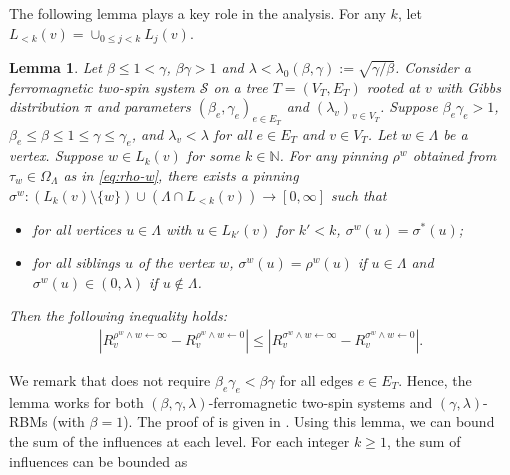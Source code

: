 \documentclass[11pt]{amsart}
\def\+#1{\mathcal{#1}}
\newcommand{\abs}[1]{\ensuremath{\left\vert#1\right\vert}}
\newcommand{\defeq}{:=}
\newtheorem{lemma}[theorem]{Lemma}
\theoremstyle{definition}
\theoremstyle{remark}
\begin{document}
The following lemma plays a key role in the analysis.
For any $k$, let $L_{<k}(v) = \cup_{0 \leq j < k}L_j(v)$.
\begin{lemma}\label{lemma:monotone-potential}
Let $\beta \leq 1 < \gamma$, $\beta\gamma > 1$ and $\lambda < \lambda_0(\beta,\gamma) \defeq \sqrt{\gamma/\beta}$.
Consider a ferromagnetic two-spin system $\+S$ on a tree $T = (V_T,E_T)$ rooted at $v$ with Gibbs distribution $\pi$ and parameters $(\beta_e,\gamma_e)_{e \in E_T}$ and $(\lambda_v)_{v \in V_T}$.
Suppose $\beta_e \gamma_e > 1$, $\beta_e \leq \beta \leq 1 \leq \gamma \leq \gamma_e$, and $\lambda_v < \lambda $ for all $e \in E_T$ and $v \in V_T$.
Let $w\in\Lambda$ be a vertex. Suppose $w \in L_k(v)$ for some $k \in \mathbb{N}$. 
For any pinning $\rho^w$ obtained from $\tau_w\in\Omega_{\Lambda}$ as in \eqref{eq:rho-w}, there exists a pinning $\sigma^w: (L_k(v) \setminus \{w\}) \cup (\Lambda \cap L_{<k}(v)) \to [0,\infty]$ such that
\begin{itemize}
\item for all vertices $u \in \Lambda$ with $u \in L_{k'}(v)$ for $k' < k$, $\sigma^w(u) = \sigma^*(u)$;
\item for all siblings $u$ of the vertex $w$, $\sigma^w(u) = \rho^w(u)$ if $u \in \Lambda$ and $\sigma^w(u) \in (0,\lambda)$ if $u \notin \Lambda$.
\end{itemize}
Then the following inequality holds:
\begin{align}\label{eq:lemma:monotone-inequality}
 \abs{R_v^{\rho^w \land w \gets \infty}-R_v^{\rho^w \land w \gets 0}} \leq \abs{R_v^{\sigma^w \land w \gets \infty}-R_v^{\sigma^w \land w \gets 0}}.
\end{align}
\end{lemma}
We remark that  does not require $\beta_e \gamma_e < \beta\gamma$ for all edges $e \in E_T$. Hence, the lemma works for both $(\beta,\gamma,\lambda)$-ferromagnetic two-spin systems and $(\gamma,\lambda)$-RBMs (with $\beta = 1$).
The proof of  is given in . Using this lemma, we can bound the sum of the influences at each level. For each integer $k \geq 1$, the sum of influences can be bounded as 
\end{document}
